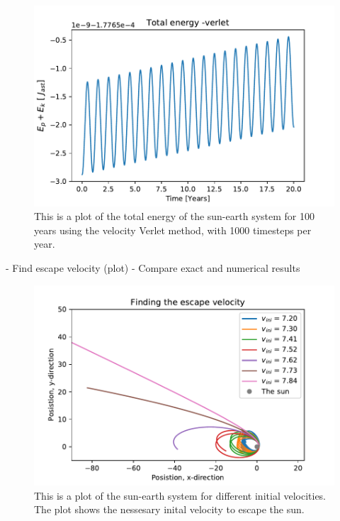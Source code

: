 \begin{figure}[H]
\includegraphics[width=1.1\linewidth]{../results/plots/totalenergy-verlet.pdf}\caption{This is a plot of the total energy of the sun-earth system for 100 years using the velocity Verlet method, with 1000 timesteps per year.}\label{fig:totalenergy-verlet}
\end{figure}

	- Find escape velocity (plot)
	 	- Compare exact and numerical results
	 	
\begin{figure}[H]
\includegraphics[width=1.1\linewidth]{../results/plots/escape_velocity.pdf}\caption{This is a plot of the sun-earth system for different initial velocities. The plot shows the nessesary inital velocity to escape the sun.}\label{fig:escape_velocity}
\end{figure}

